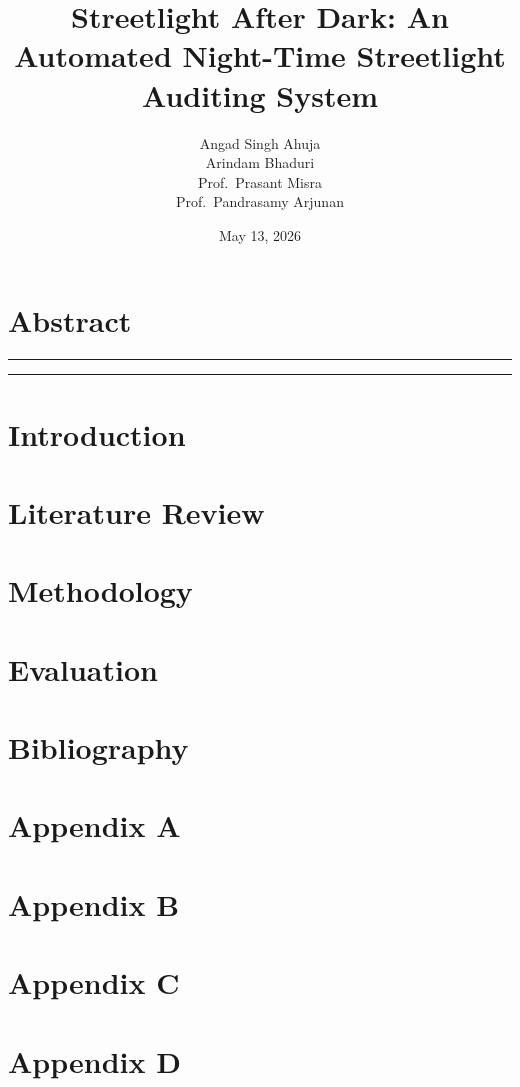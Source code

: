 \documentclass[12pt]{article}
\title{Streetlight After Dark: An Automated Night-Time Streetlight Auditing System}
\author{Angad Singh Ahuja \\ Arindam Bhaduri \\ Prof.\ Prasant Misra \\ Prof.\ Pandrasamy Arjunan}
\date{May 13, 2026}
\begin{document}
\maketitle

\section*{Abstract}
\noindent
\rule{\textwidth}{0.4pt}
\vspace{5\baselineskip}
\rule{\textwidth}{0.4pt}
\clearpage

\section{Introduction}
\vspace*{\fill}
\clearpage

\section{Literature Review}
\vspace*{\fill}
\clearpage

\section{Methodology}
\vspace*{\fill}
\clearpage
\vspace*{\fill}
\clearpage
\vspace*{\fill}
\clearpage

\section{Evaluation}
\vspace*{\fill}
\clearpage
\vspace*{\fill}
\clearpage

\section*{Bibliography}
\vspace*{\fill}
\clearpage

\appendix

\section{Appendix A}
\vspace*{\fill}
\clearpage

\section{Appendix B}
\vspace*{\fill}
\clearpage

\section{Appendix C}
\vspace*{\fill}
\clearpage

\section{Appendix D}
\vspace*{\fill}
\end{document}
